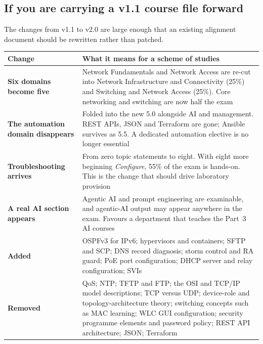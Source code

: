 \documentclass[11pt,a4paper,oneside]{report}
\begin{document}
\subsection{If you are carrying a v1.1 course file forward}

The changes from v1.1 to v2.0 are large enough that an existing alignment
document should be rewritten rather than patched.

\begin{longtable}{@{}L{5.2cm}L{10.3cm}@{}}
\toprule
{}
\textbf{Change} & \textbf{What it means for a scheme of studies} \\
\midrule
\endhead
\textbf{Six domains become five} &
Network Fundamentals and Network Access are re-cut into Network Infrastructure
and Connectivity (25\%) and Switching and Network Access (25\%). Core networking
and switching are now half the exam \\
\textbf{The automation domain disappears} &
Folded into the new 5.0 alongside AI and management. REST APIs, JSON and
Terraform are gone; Ansible survives as 5.5. A dedicated automation elective is
no longer essential \\
\textbf{Troubleshooting arrives} &
From zero topic statements to eight. With eight more beginning \emph{Configure},
55\% of the exam is hands-on. This is the change that should drive laboratory
provision \\
\textbf{A real AI section appears} &
Agentic AI and prompt engineering are examinable, and agentic-AI output may
appear anywhere in the exam. Favours a department that teaches the Part~3 AI
courses \\
\textbf{Added} &
OSPFv3 for IPv6; hypervisors and containers; SFTP and SCP; DNS record diagnosis;
storm control and RA guard; PoE port configuration; DHCP server and relay
configuration; SVIs \\
\textbf{Removed} &
QoS; NTP; TFTP and FTP; the OSI and TCP/IP model descriptions; TCP versus UDP;
device-role and topology-architecture theory; switching concepts such as MAC
learning; WLC GUI configuration; security programme elements and password policy;
REST API architecture; JSON; Terraform \\
\bottomrule
\end{longtable}
\end{document}
